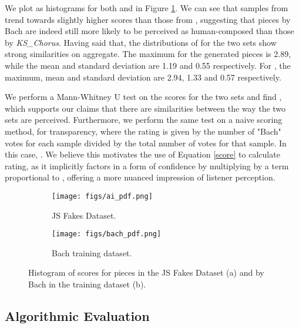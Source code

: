 \documentclass{article}
\begin{document}
We plot  as histograms for both  and  in Figure \ref{fig:pdf}. We can see that samples from  trend towards slightly higher scores than those from  , suggesting that pieces by Bach are indeed still more likely to be perceived as human-composed than those by \textit{KS\_Chorus}. Having said that, the distributions of  for the two sets show strong similarities on aggregate. The maximum  for the generated pieces  is 2.89, while the mean and standard deviation are 1.19 and 0.55 respectively. For , the maximum, mean and standard deviation are 2.94, 1.33 and 0.57 respectively.

We perform a Mann-Whitney U test on the  scores for the two sets and find , which supports our claims that there are similarities between the way the two sets are perceived. Furthermore, we perform the same test on a naive scoring method, for transparency, where the rating is given by the number of "Bach" votes for each sample divided by the total number of votes for that sample. In this case, . We believe this motivates the use of Equation \ref{score} to calculate rating, as it implicitly factors in a form of confidence by multiplying by a term proportional to , offering a more nuanced impression of listener perception.

\begin{figure}
\centering
\begin{subfigure}{.5\textwidth}
  \centering
  \texttt{[image: figs/ai\_pdf.png]}
  \caption{JS Fakes Dataset.}\end{subfigure}\begin{subfigure}{.5\textwidth}
  \centering
  \texttt{[image: figs/bach\_pdf.png]}
  \caption{Bach training dataset.}
\end{subfigure}
\caption{Histogram of scores  for pieces in the JS Fakes Dataset (a) and by Bach in the training dataset (b).}
\label{fig:pdf}
\end{figure}

\subsection{Algorithmic Evaluation}\label{subsec:algoeval}
\end{document}
